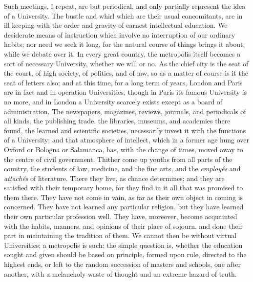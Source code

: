 Such meetings, I repeat, are but periodical, and only partially
represent the idea of a University. The bustle and whirl which are
their usual concomitants, are in ill keeping with the order and
gravity of earnest intellectual education. We desiderate means of
instruction which involve no interruption of our ordinary habits; nor
need we seek it long, for the natural course of things brings it
about, while we debate over it. In every great country, the metropolis
itself becomes a sort of necessary University, whether we will or no.
As the chief city is the seat of the court, of high society, of
politics, and of law, so as a matter of course is it the seat of
letters also; and at this time, for a long term of years, London and
Paris are in fact and in operation Universities, though in Paris its
famous University is no more, and in London a University scarcely
exists except as a board of administration. The newspapers, magazines,
reviews, journals, and periodicals of all kinds, the publishing trade,
the libraries, museums, and academies there found, the learned and
scientific societies, necessarily invest it with the functions of a
University; and that atmosphere of intellect, which in a former age
hung over Oxford or Bologna or Salamanca, has, with the change of
times, moved away to the centre of civil government. Thither come up
youths from all parts of the country, the students of law, medicine,
and the fine arts, and the \emph{employés} and \emph{attachés} of
literature. There they live, as chance determines; and they are
satisfied with their temporary home, for they find in it all that was
promised to them there. They have not come in vain, as far as their
own object in coming is concerned. They have not learned any
particular religion, but they have learned their own particular
profession well. They have, moreover, become acquainted with the
habits, manners, and opinions of their place of sojourn, and done
their part in maintaining the tradition of them. We cannot then be
without virtual Universities; a metropolis is such: the simple
question is, whether the education sought and given should be based on
principle, formed upon rule, directed to the highest ends, or left to
the random succession of masters and schools, one after another, with
a melancholy waste of thought and an extreme hazard of truth.

